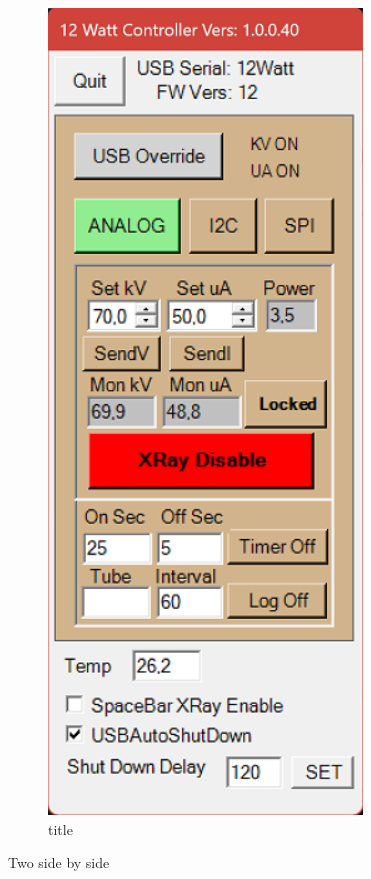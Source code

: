 \begin{figure}
\begin{subfigure}{.3\textwidth}
            \includegraphics{pictures/12WattController_70kV_10uA.png}
            \caption[short]{title}%
            \label{subfig:12WattController 70kV}
        \end{subfigure}
        \caption[short]{Two side by side }%
        \label{fig:12WattController 10kV and 70kV}
    \end{figure}